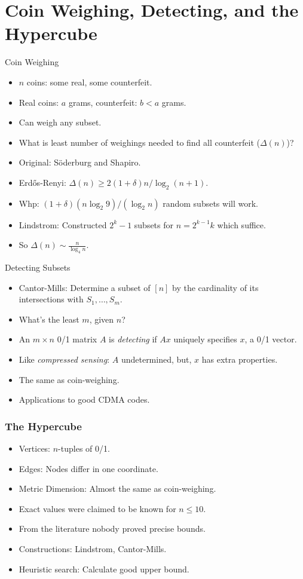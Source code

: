 \documentclass{beamer}
\begin{document}
\section{Coin Weighing, Detecting, and the Hypercube}
\label{sec:hypercube}
\begin{frame}{Coin Weighing}
  \begin{itemize}
  \item $n$ coins: some real, some counterfeit.
  \item Real coins: $a$ grams, counterfeit: $b < a$ grams.
  \item Can weigh any subset.
  \item What is least number of weighings needed to find all
    counterfeit ($\Delta(n)$)?
  \item Original: S{\"o}derburg and Shapiro.
  \item Erd{\H o}s-Renyi: $\Delta(n) \ge 2(1+\delta) n/\log_2(n+1)$.
  \item Whp: $(1+\delta)(n \log_2 9)/(\log_2 n)$ random subsets will
    work.
  \item Lindstrom: Constructed $2^k-1$ subsets for $n=2^{k-1} k$ which
    suffice.
  \item So $\Delta(n) \sim \frac{n}{\log_4 n}$.
  \end{itemize}
\end{frame}
\begin{frame}{Detecting Subsets}
  \begin{itemize}
  \item Cantor-Mills: Determine a subset of $[n]$ by the cardinality
    of its intersections with $S_1, \dots, S_m$.
  \item What's the least $m$, given $n$?
  \item An $m \times n$ 0/1 matrix $A$ is \emph{detecting} if $Ax$
    uniquely specifies $x$, a 0/1 vector.
  \item Like \emph{compressed sensing}: $A$ undetermined, but, $x$ has
    extra properties.
  \item The same as coin-weighing.
  \item Applications to good CDMA codes.
  \end{itemize}
\end{frame}
\begin{frame}
  \frametitle{The Hypercube}
  \begin{itemize}
  \item Vertices: $n$-tuples of 0/1.
  \item Edges: Nodes differ in one coordinate.
  \item Metric Dimension: Almost the same as coin-weighing.
  \item Exact values were claimed to be known for $n \le 10$.
  \item From the literature nobody proved precise bounds.
  \item Constructions: Lindstrom, Cantor-Mills.
  \item Heuristic search: Calculate good upper bound.
  \end{itemize}
\end{frame}
\end{document}
